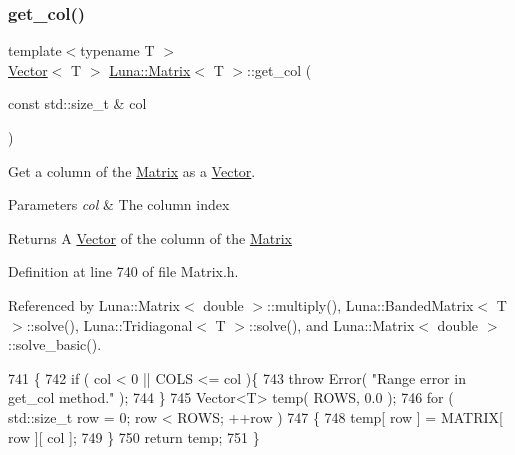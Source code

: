 \subsubsection{\texorpdfstring{get\+\_\+col()}{get\_col()}}
{\footnotesize\ttfamily template$<$typename T $>$ \\
\hyperlink{classLuna_1_1Vector}{Vector}$<$ T $>$ \hyperlink{classLuna_1_1Matrix}{Luna\+::\+Matrix}$<$ T $>$\+::get\+\_\+col (\begin{DoxyParamCaption}\item[{const std\+::size\+\_\+t \&}]{col }\end{DoxyParamCaption})\hspace{0.3cm}{\ttfamily [inline]}}



Get a column of the \hyperlink{classLuna_1_1Matrix}{Matrix} as a \hyperlink{classLuna_1_1Vector}{Vector}. 


\begin{DoxyParams}{Parameters}
{\em col} & The column index \\
\hline
\end{DoxyParams}
\begin{DoxyReturn}{Returns}
A \hyperlink{classLuna_1_1Vector}{Vector} of the column of the \hyperlink{classLuna_1_1Matrix}{Matrix} 
\end{DoxyReturn}


Definition at line 740 of file Matrix.\+h.



Referenced by Luna\+::\+Matrix$<$ double $>$\+::multiply(), Luna\+::\+Banded\+Matrix$<$ T $>$\+::solve(), Luna\+::\+Tridiagonal$<$ T $>$\+::solve(), and Luna\+::\+Matrix$<$ double $>$\+::solve\+\_\+basic().


\begin{DoxyCode}
741   \{
742     \textcolor{keywordflow}{if} ( col < 0 || COLS <= col )\{
743       \textcolor{keywordflow}{throw} Error( \textcolor{stringliteral}{"Range error in get\_col method."} );
744     \}
745     Vector<T> temp( ROWS, 0.0 );
746     \textcolor{keywordflow}{for} ( std::size\_t row = 0; row < ROWS; ++row )
747     \{
748       temp[ row ] = MATRIX[ row ][ col ];
749     \}
750     \textcolor{keywordflow}{return} temp;
751   \}
\end{DoxyCode}
\mbox{\label{classLuna_1_1Matrix_a3cb45a069b0ef89e0d8a93b8affed1eb}} 
